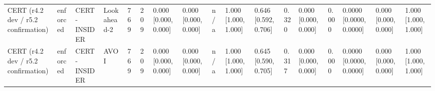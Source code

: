 \begin{table}[!ht]
{\begin{tabular}{lllllllllllllllll}
CERT (r4.2 dev / r5.2 confirmation) & enforced & CERT-INSIDER & Lookahead-2 & 769 & 209 & 0.000 [0.000, 0.000] & 0.000 [0.000, 0.000] & n/a & 1.000 [1.000, 1.000] & 0.646 [0.592, 0.706] & 0.320 & 0.000 [0.000, 0.000] & 0.000 & 0.0000 [0.0000, 0.0000] & 0.000 [0.000, 0.000] & 1.000 [1.000, 1.000] \\
CERT (r4.2 dev / r5.2 confirmation) & enforced & CERT-INSIDER & AVOI & 769 & 209 & 0.000 [0.000, 0.000] & 0.000 [0.000, 0.000] & n/a & 1.000 [1.000, 1.000] & 0.645 [0.590, 0.705] & 0.317 & 0.000 [0.000, 0.000] & 0.000 & 0.0000 [0.0000, 0.0000] & 0.000 [0.000, 0.000] & 1.000 [1.000, 1.000] \\
\bottomrule
\end{tabular}}
\end{table}
